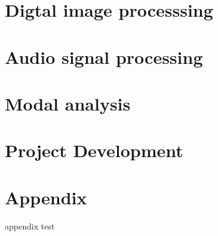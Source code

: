 \documentclass[UTF8]{book}
\begin{document}
	
	\part{Digtal image processsing}
	
	\part{Audio signal processing}
	
	\part{Modal analysis}	
	
	\part{Project Development}
	
	\begin{comment} 
	rather stupid, but helpful 
	\chapter{8-channel data acquistion system design}
	\chapter{32-channel data acquistion system design}
	\chapter{64-channel data acquistion system design}
	\end{comment}

	
	\part{Appendix}
	
	appendix test
	
	
\end{document}
